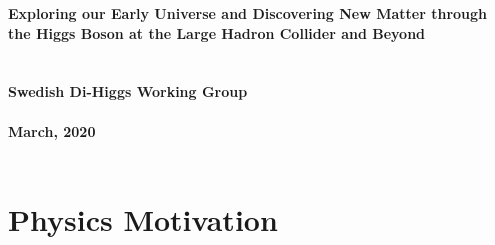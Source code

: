 \documentclass[10pt,oneside,notitlepage,abstracton,a4paper]{scrartcl}
\begin{document}
\begin{center}
\Large\textbf{Exploring our Early Universe and Discovering New Matter through the Higgs Boson at the Large Hadron Collider and Beyond} \\ \\
\textbf{\\ Swedish Di-Higgs Working Group}\\ \\
\textbf{March, 2020}\\ \\
\end{center}

\section{Physics Motivation}
\end{document}
